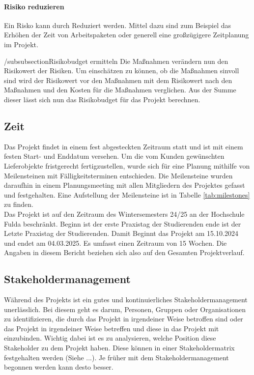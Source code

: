 \documentclass[ThesisDJ.tex]{subfiles}
\begin{document}
\paragraph{Risiko reduzieren}
Ein Risko kann durch Reduziert werden. Mittel dazu sind zum Beispiel das Erhöhen der Zeit von Arbeitspaketen oder generell eine großzügigere Zeitplanung im Projekt.

/subsubsection{Risikobudget ermitteln}
Die Maßnahmen verändern nun den Risikowert der Risiken. Um einschätzen zu können, ob die Maßnahmen sinvoll sind wird der Risikowert vor den Maßnahmen mit dem Risikowert nach den Maßnahmen und den Kosten für die Maßnahmen verglichen. Aus der Summe dieser lässt sich nun das Risikobudget für das Projekt berechnen.

\subsection{Zeit}
Das Projekt findet in einem fest abgesteckten Zeitraum statt und ist mit einem festen Start- und Enddatum versehen.
Um die vom Kunden gewünschten Lieferobjekte fristgerecht fertigzustellen, wurde sich für eine Planung mithilfe von Meilensteinen mit
Fälligkeitsterminen entschieden. Die Meilensteine wurden daraufhin in einem Planungsmeeting mit allen Mitgliedern des Projektes gefasst und festgehalten.
Eine Aufstellung der Meilensteine ist in Tabelle \ref{tab:milestones} zu finden.\\

Das Projekt ist auf den Zeitraum des Wintersemesters 24/25 an der Hochschule Fulda beschränkt.
Beginn ist der erste Praxistag der Studierenden ende ist der Letzte Praxistag der Studierenden. 
Damit Beginnt das Projekt am 15.10.2024 und endet am 04.03.2025. Es umfasst einen Zeitraum von 15 Wochen. 
Die Angaben in diesem Bericht beziehen sich also auf den Gesamten Projektverlauf.

\subsection{Stakeholdermanagement}

Während des Projekts ist ein gutes und kontinuierliches Stakeholdermanagement unerlässlich. 
Bei diesem geht es darum, Personen, Gruppen oder Organisationen zu identifizieren, die durch das Projekt in irgendeiner Weise betroffen sind oder das
Projekt in irgendeiner Weise betreffen und diese in das Projekt mit einzubinden. Wichtig dabei ist es zu analysieren, welche Position 
diese Stakeholder zu dem Projekt haben. Diese können in einer Stakeholdermatrix festgehalten werden (Siehe ...). 
Je früher mit dem Stakeholdermanagement begonnen werden kann desto besser.
\end{document}
